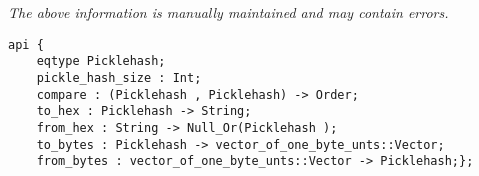 \label{api:Picklehash}

{\tiny \it The above information is manually maintained and may contain errors.}
\begin{verbatim}
api {
    eqtype Picklehash;
    pickle_hash_size : Int;
    compare : (Picklehash , Picklehash) -> Order;
    to_hex : Picklehash -> String;
    from_hex : String -> Null_Or(Picklehash );
    to_bytes : Picklehash -> vector_of_one_byte_unts::Vector;
    from_bytes : vector_of_one_byte_unts::Vector -> Picklehash;};
\end{verbatim}
